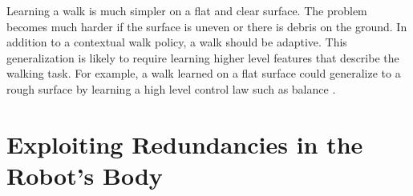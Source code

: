 \documentclass[12 pt]{article}
\begin{document}
Learning a walk is much simpler on a flat and clear surface. 
The problem becomes much harder if the surface is uneven or there is debris on the ground. 
In addition to a contextual walk policy, a walk should be adaptive.
This generalization is likely to require learning higher level features that describe the walking task.
For example, a walk learned on a flat surface could generalize to a rough surface by learning a high level control law such as balance \cite{levine2013exploring}.


\section{Exploiting Redundancies in the Robot's Body}




\end{document}
